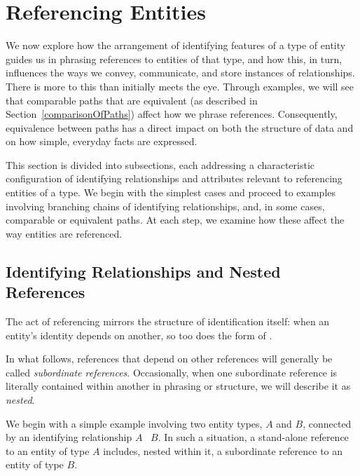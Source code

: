 
\newcommand{\BarkerEllisIdentiyingRelationship}{\barkerEllisJ}

\section{Referencing Entities}
\label{ReferencingEntities}

We now explore how the arrangement of identifying features of a type of entity
 guides us in phrasing references to entities of that type, 
 and how this, in turn, influences the ways we convey, communicate, and store instances of relationships.
There is more to this than initially meets the eye.
Through examples, we will see that comparable paths that are equivalent (as described in Section~\ref{comparisonOfPaths}) affect how we phrase references.
Consequently, equivalence between paths has a direct impact on both the structure of data and on how simple, everyday facts are expressed.

This section is divided into subsections, each addressing a characteristic configuration of identifying relationships and attributes relevant to referencing entities of a type.
We begin with the simplest cases and proceed to examples involving branching chains of identifying relationships, and, in some cases, comparable or equivalent paths.
At each step, we examine how these affect the way entities are referenced.

\subsection{Identifying Relationships and Nested References}
\begin{worktt}The act of referencing mirrors the structure of identification itself: when an entity’s identity depends on another, so too does the form of . 
\end{worktt}
\noindent
\begin{worktt}
In what follows, references that depend on other references will generally be called \textit{subordinate references}.
Occasionally, when one subordinate reference is literally contained within another in phrasing or structure, we will describe it as \textit{nested}. 
\end{worktt}

We begin with a simple example involving two entity types, $A$ and $B$, connected by an identifying relationship
$A$ \BarkerEllisIdentiyingRelationship\ $B$.
In such a situation, a stand-alone reference to an entity of type $A$ includes, nested within it, a subordinate reference to an entity of type $B$.

